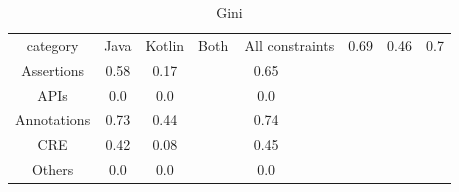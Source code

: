 \begin{table}[]
\centering
\caption{Gini}
\label{tab:contractsGini}
\begin{tabular}{| c | c | c | c | } \hline
category & Java & Kotlin & Both \ \hline
	All constraints & 0.69 & 0.46 & 0.7 \\ 
	Assertions & 0.58 & 0.17 & 0.65 \\ 
	APIs & 0.0 & 0.0 & 0.0 \\ 
	Annotations & 0.73 & 0.44 & 0.74 \\ 
	CRE & 0.42 & 0.08 & 0.45 \\ 
	Others & 0.0 & 0.0 & 0.0 \\ 
\hline
\end{tabular}
\end{table}
